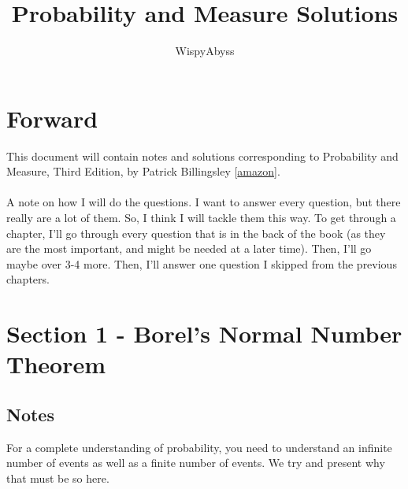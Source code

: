 \documentclass[12pt,a4paper]{article}
\title{Probability and Measure Solutions}
\author{WispyAbyss}
\newcommand{\1}[1]{\mathbbm{1}\left\{ #1 \right\}}
\begin{document}
\maketitle
	
\tableofcontents
	
\section{Forward}
This document will contain notes and solutions corresponding to Probability and Measure, Third Edition, by Patrick Billingsley  [\href{https://www.amazon.com/PROBABILITY-MEASURE-WILEY-MATHEMATICAL-STATISTICS/dp/8126517719/ref=sr_1_2?crid=3IVF52UANVNQC&keywords=Probability+and+Measure+by+Patrick+Billingsley&qid=1694149664&s=books&sprefix=probability+and+measure+by+patrick+billingsley%2Cstripbooks%2C143&sr=1-2}{amazon}].
\\\\
A note on how I will do the questions. I want to answer every question, but there really are a lot of them. So, I think I will tackle them this way. To get through a chapter, I'll go through every question that is in the back of the book (as they are the most important, and might be needed at a later time). Then, I'll go maybe over 3-4 more. Then, I'll answer one question I skipped from the previous chapters.

\section{Section 1 - Borel's Normal Number Theorem}
\subsection{Notes}
For a complete understanding of probability, you need to understand an infinite number of events as well as a finite number of events. We try and present why that must be so here.
\end{document}
